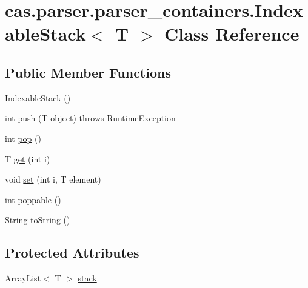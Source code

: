 \hypertarget{classcas_1_1parser_1_1parser__containers_1_1_indexable_stack_3_01_t_01_4}{\section{cas.\-parser.\-parser\-\_\-containers.\-Indexable\-Stack$<$ T $>$ Class Reference}
\label{classcas_1_1parser_1_1parser__containers_1_1_indexable_stack_3_01_t_01_4}
}
\subsection*{Public Member Functions}
\begin{DoxyCompactItemize}
\item 
\hyperlink{classcas_1_1parser_1_1parser__containers_1_1_indexable_stack_3_01_t_01_4_a77cdc8a7b1328ea1a79596323748e063}{Indexable\-Stack} ()
\item 
int \hyperlink{classcas_1_1parser_1_1parser__containers_1_1_indexable_stack_3_01_t_01_4_adff8db7d2e5a71e36d3cfeaee0877e74}{push} (T object)  throws Runtime\-Exception
\item 
int \hyperlink{classcas_1_1parser_1_1parser__containers_1_1_indexable_stack_3_01_t_01_4_ae722898670ffad7e72be3156f4f1045b}{pop} ()
\item 
T \hyperlink{classcas_1_1parser_1_1parser__containers_1_1_indexable_stack_3_01_t_01_4_a73e35a0fc50450cc97490a101631c777}{get} (int i)
\item 
void \hyperlink{classcas_1_1parser_1_1parser__containers_1_1_indexable_stack_3_01_t_01_4_a42dd3c5376aab3d20ef7bae7593cc943}{set} (int i, T element)
\item 
int \hyperlink{classcas_1_1parser_1_1parser__containers_1_1_indexable_stack_3_01_t_01_4_a969637098846092ef3618a4fa21a5987}{poppable} ()
\item 
String \hyperlink{classcas_1_1parser_1_1parser__containers_1_1_indexable_stack_3_01_t_01_4_a7a3a452fbec96a81daa705e27982206d}{to\-String} ()
\end{DoxyCompactItemize}
\subsection*{Protected Attributes}
\begin{DoxyCompactItemize}
\item 
Array\-List$<$ T $>$ \hyperlink{classcas_1_1parser_1_1parser__containers_1_1_indexable_stack_3_01_t_01_4_a1c0b5f377c93609c56559585b4d8312e}{stack}
\end{DoxyCompactItemize}


